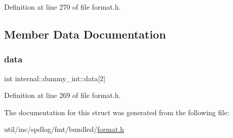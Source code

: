 Definition at line 270 of file format.\+h.



\subsection{Member Data Documentation}
\mbox{\label{structinternal_1_1dummy__int_a3f4ae21cfd3419d4b683e71ee347670b}} 
\subsubsection{\texorpdfstring{data}{data}}
{\footnotesize\ttfamily int internal\+::dummy\+\_\+int\+::data\mbox{[}2\mbox{]}}



Definition at line 269 of file format.\+h.



The documentation for this struct was generated from the following file\+:\begin{DoxyCompactItemize}
\item 
util/inc/spdlog/fmt/bundled/\hyperlink{format_8h}{format.\+h}\end{DoxyCompactItemize}

